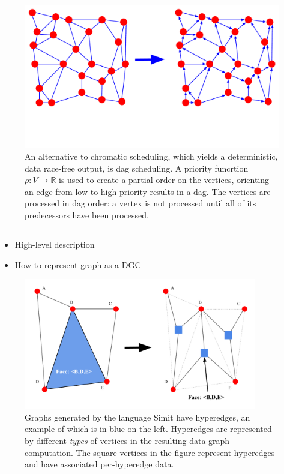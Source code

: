 \begin{figure}[h]
\centering
\includegraphics[width=5in,clip,trim=0 3cm 0 0]{dag_scheduling.pdf}
\caption{An alternative to chromatic scheduling, which 
yields a deterministic, data race-free output, is dag scheduling.
A priority funcrtion $\rho : V \rightarrow \mathbb{R}$ is used
to create a partial order on the vertices, orienting an edge from
low to high priority results in a 
dag.  The vertices are processed in dag order: a vertex is not
processed until all of its predecessors have been processed.}
\label{fig:}
\end{figure}




\subsection{}
		\begin{itemize}
		\item High-level description
		\item How to represent graph as a DGC
		\end{itemize}


\begin{figure}[h]
\centering
\includegraphics[width=4in]{hyperedge.pdf}
\caption{Graphs generated by the language Simit have hyperedges, an example
of which is in blue on the left.  Hyperedges are represented by different
\emph{types} of vertices in the resulting data-graph computation.
The square vertices in the figure represent hyperedges and have associated
per-hyperedge data.}
\label{fig:hyperedge}
\end{figure}

